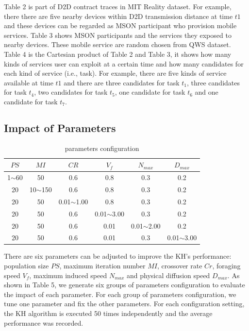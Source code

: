 \documentclass[10pt,journal,compsoc]{IEEEtran}
\begin{document}
Table 2 is part of D2D contract traces in MIT Reality dataset. For example, there there are five nearby devices within D2D transmission distance at time $t1$ and these devices can be regarded as MSON participant who provision mobile services. Table 3 shows MSON participants and the services they exposed to nearby devices. These mobile service are random chosen from QWS dataset. Table 4 is the Cartesian product of Table 2 and Table 3, it shows how many kinds of services user can exploit at a certain time and how many candidates for each kind of service (i.e., task). For example, there are five kinds of service available at time $t1$ and there are three candidates for task $t_1$, three candidates for task $t_4$, two candidates for task $t_5$, one candidate for task $t_6$ and one candidate for task $t_7$.

\subsection{Impact of Parameters}

\begin{table}[!t]
\renewcommand{\arraystretch}{1.3}
\caption{parameters configuration}
\label{table_example}
\centering
\begin{tabular}{cccccc}
\hline
\bfseries $PS$ & \bfseries $MI$ & \bfseries $CR$ & \bfseries $V_f$ & \bfseries $N_{max}$ & \bfseries $D_{max}$ \\
\hline
1$\sim$60 & 50          & 0.6            & 0.8            &  0.3            &  0.2 \\
20        & 10$\sim$150 & 0.6            & 0.8            &  0.3            &  0.2 \\
20        & 50          & 0.01$\sim$1.00 & 0.8            &  0.3            &  0.2 \\
20        & 50          & 0.6            & 0.01$\sim$3.00 &  0.3            &  0.2 \\
20        & 50          & 0.6            & 0.01           &  0.01$\sim$2.00 &  0.2 \\
20        & 50          & 0.6            & 0.01           &  0.3            &  0.01$\sim$3.00 \\
\hline
\end{tabular}
\end{table}

There are six parameters can be adjusted to improve the KH's performance: population size $PS$, maximum iteration number $MI$, crossover rate $Cr$, foraging speed $V_f$, maximum induced speed $N_{max}$ and physical diffusion speed $D_{max}$. As shown in Table 5, we generate six groups of parameters configuration to evaluate the impact of each parameter. For each group of parameters configuration, we tune one parameter and fix the other parameters. For each configuration setting, the KH algorithm is executed 50 times independently and the average performance was recorded.
\end{document}
